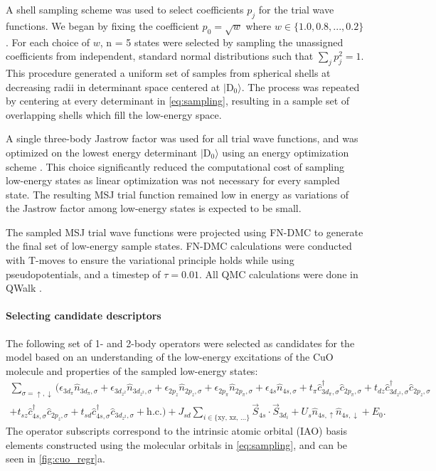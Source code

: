 \documentclass[12pt]{article}
\begin{document}
A shell sampling scheme was used to select coefficients $p_j$ for the trial wave functions.
We began by fixing the coefficient $p_0 = \sqrt{w}$ where $w \in \{1.0, 0.8, ..., 0.2\}$. 
For each choice of $w$, n = 5 states were selected by sampling the unassigned coefficients from independent, standard normal distributions such that $\sum_j p_j^2 = 1$. 
This procedure generated a uniform set of samples from spherical shells at decreasing radii in determinant space centered at $|\text{D}_0\rangle$.
The process was repeated by centering at every determinant in \eqref{eq:sampling}, resulting in a sample set of overlapping shells which fill the low-energy space.

A single three-body Jastrow factor was used for all trial wave functions, and was optimized on the lowest energy determinant $|\text{D}_0 \rangle$ using an energy optimization scheme \cite{Toulouse2007}.
This choice significantly reduced the computational cost of sampling low-energy states as linear optimization was not necessary for every sampled state.
The resulting MSJ trial function remained low in energy as variations of the Jastrow factor among low-energy states is expected to be small.

The sampled MSJ trial wave functions were projected using FN-DMC to generate the final set of low-energy sample states.
FN-DMC calculations were conducted with T-moves \cite{PhysRevB.74.161102} to ensure the variational principle holds while using pseudopotentials, and a timestep of $\tau = 0.01$.
All QMC calculations were done in QWalk \cite{Wagner2009}.

\vspace{-10pt}
\paragraph{Selecting candidate descriptors}
The following set of 1- and 2-body operators were selected as candidates for the model based on an understanding of the low-energy excitations of the CuO molecule and properties of the sampled low-energy states:
\begin{equation}
\begin{split}
\sum_{\sigma = \uparrow, \downarrow} \Bigg(\epsilon_{3d_\pi}\hat{n}_{3d_\pi,\sigma} + \epsilon_{3d_{z^2}}\hat{n}_{3d_{z^2},\sigma} +  \epsilon_{2p_z} \hat{n}_{2p_z,\sigma} + \epsilon_{2p_\pi}\hat{n}_{2p_\pi,\sigma} + \epsilon_{4s}\hat{n}_{4s,\sigma} +
t_\pi \hat{c}_{3d_\pi,\sigma}^\dagger \hat{c}_{2p_\pi,\sigma} + t_{dz} \hat{c}_{3d_{z^2},\sigma}^\dagger \hat{c}_{2p_z,\sigma}\\
  + t_{sz}\hat{c}_{4s,\sigma}^\dagger \hat{c}_{2p_z,\sigma} + t_{sd}\hat{c}_{4s,\sigma}^\dagger \hat{c}_{3d_{z^2},\sigma} + \text{h.c.} \Bigg)  +
J_{sd}\sum_{i\in {\{\text{xy, xz, ...}}\}} \vec{S}_{4s} \cdot \vec{S}_{3d_i} + U_s \hat{n}_{4s,\uparrow}\hat{n}_{4s,\downarrow} + E_0.
\end{split}
\label{eq:models}
\end{equation}
The operator subscripts correspond to the intrinsic atomic orbital (IAO) basis elements constructed using the molecular orbitals in \eqref{eq:sampling}, and can be seen in \ref{fig:cuo_regr}a.
\end{document}
